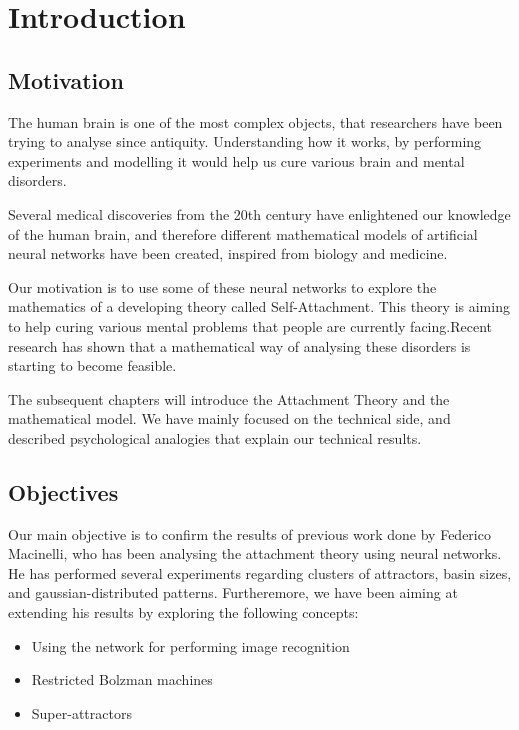 \documentclass[11pt,a4paper,oneside]{report}
\begin{document}
\tableofcontents

\chapter{Introduction}

\section{Motivation}
The human brain is one of the most complex objects, that researchers have been trying to analyse since antiquity. Understanding how it works, by performing experiments and modelling it would help us cure various brain and mental disorders. 

Several medical discoveries from the 20th century have enlightened our knowledge of the human brain, and therefore different mathematical models of artificial neural networks have been created, inspired from biology and medicine. 

Our motivation is to use some of these neural networks to explore the mathematics of a developing theory called Self-Attachment. This theory is aiming to help curing various mental problems that people are currently facing.Recent research has shown that a mathematical way of analysing these disorders is starting to become feasible. \cite{net_model_neuroses}

The subsequent chapters will introduce the Attachment Theory and the mathematical model. We have mainly focused on the technical side, and described  psychological analogies that explain our technical results. 

\section{Objectives}

Our main objective is to confirm the results of previous work done by Federico Macinelli, who has been analysing the attachment theory using neural networks. He has performed several experiments regarding clusters of attractors, basin sizes, and gaussian-distributed patterns. Furtheremore, we have been aiming at extending his results by exploring the following concepts:
\begin{itemize}
\item Using the network for performing image recognition
\item Restricted Bolzman machines
\item Super-attractors
\end{itemize}
\end{document}
